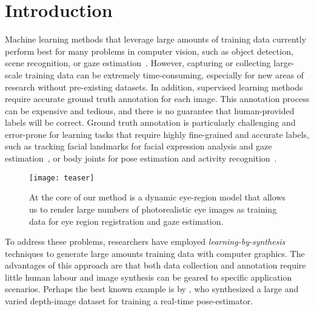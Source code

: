 
\section{Introduction}


Machine learning methods that leverage large amounts of training data currently perform best for many problems in computer vision, such as object detection, scene recognition, or gaze estimation~\cite{zhou2014learning,girshick2014rich,zhang15_cvpr}.
However, capturing or collecting large-scale training data can be extremely time-consuming, especially for new areas of research without pre-existing datasets.
In addition, supervised learning methods require accurate ground truth annotation for each image.
This annotation process can be expensive and tedious, and there is no guarantee that human-provided labels will be correct.
Ground truth annotation is particularly challenging and error-prone for learning tasks that require highly fine-grained and accurate labels, such as tracking facial landmarks for facial expression analysis and gaze estimation~, or body joints for pose estimation and activity recognition~.

\begin{figure}
    \texttt{[image: teaser]}
    \caption{At the core of our method is a dynamic eye-region model that allows us to render large numbers of photorealistic eye images as training data for eye region registration and gaze estimation.}
    \label{fig:teaser}
\end{figure}

To address these problems, researchers have employed \emph{learning-by-synthesis} techniques to generate large amounts training data with computer graphics.
The advantages of this approach are that both data collection and annotation require little human labour and image synthesis can be geared to specific application scenarios.
Perhaps the best known example is by \citet{shotton2013real}, who synthesized a large and varied depth-image dataset for training a real-time pose-estimator.


